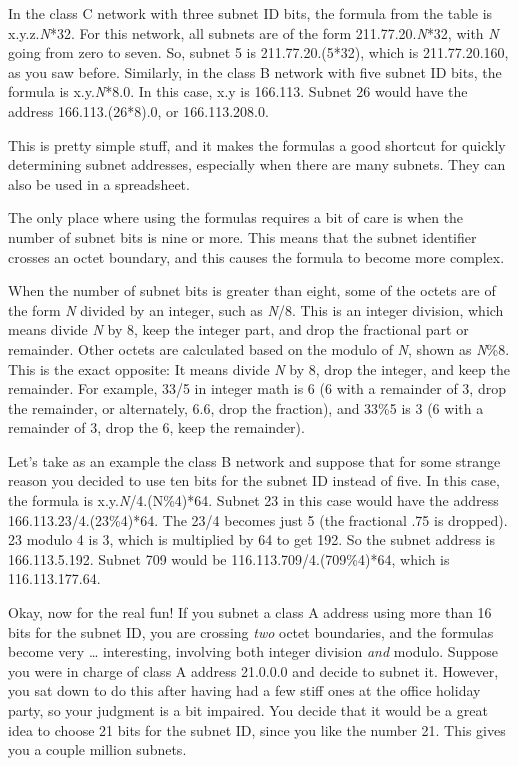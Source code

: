 In the class C network with three subnet ID bits, the formula from the
table is x.y.z.{\emph{N}}*32. For this network, all subnets are of the
form 211.77.20.{\emph{N}}*32, with {\emph{N}} going from zero to seven.
So, subnet 5 is 211.77.20.(5*32), which is 211.77.20.160, as you saw
before. Similarly, in the class B network with five subnet ID bits, the
formula is x.y.{\emph{N}}*8.0. In this case, x.y is 166.113. Subnet 26
would have the address 166.113.(26*8).0, or 166.113.208.0.

This is pretty simple stuff, and it makes the formulas a good shortcut
for quickly determining subnet addresses, especially when there are many
subnets. They can also be used in a spreadsheet.

The only place where using the formulas requires a bit of care is when
the number of subnet bits is nine or more. This means that the subnet
identifier crosses an octet boundary, and this causes the formula to
become more complex.

When the number of subnet bits is greater than eight, some of the octets
are of the form {\emph{N}} divided by an integer, such as {\emph{N}}/8.
This is an integer division, which means divide {\emph{N}} by 8, keep
the integer part, and drop the fractional part or remainder. Other
octets are calculated based on the modulo of {\emph{N}}, shown as
{\emph{N}}\%8. This is the exact opposite: It means divide {\emph{N}} by
8, drop the integer, and keep the remainder. For example, 33/5 in
integer math is 6 (6 with a remainder of 3, drop the remainder, or
alternately, 6.6, drop the fraction), and 33\%5 is 3 (6 with a remainder
of 3, drop the 6, keep the remainder).

Let's take as an example the class B network and suppose that for some
strange reason you decided to use ten bits for the subnet ID instead of
five. In this case, the formula is x.y.{\emph{N}}/4.(N\%4)*64. Subnet 23
in this case would have the address 166.113.23/4.(23\%4)*64. The 23/4
becomes just 5 (the fractional .75 is dropped). 23 modulo 4 is 3, which
is multiplied by 64 to get 192. So the subnet address is 166.113.5.192.
Subnet 709 would be 116.113.709/4.(709\%4)*64, which is 116.113.177.64.

Okay, now for the real fun! If you subnet a class A address using more
than 16 bits for the subnet ID, you are crossing {\emph{two}} octet
boundaries, and the formulas become very \ldots{} interesting, involving
both integer division {\emph{and}} modulo. Suppose you were in charge of
class A address 21.0.0.0 and decide to subnet it. However, you sat down
to do this after having had a few stiff ones at the office holiday
party, so your judgment is a bit impaired. You decide that it would be a
great idea to choose 21 bits for the subnet ID, since you like the
number 21. This gives you a couple million subnets.

